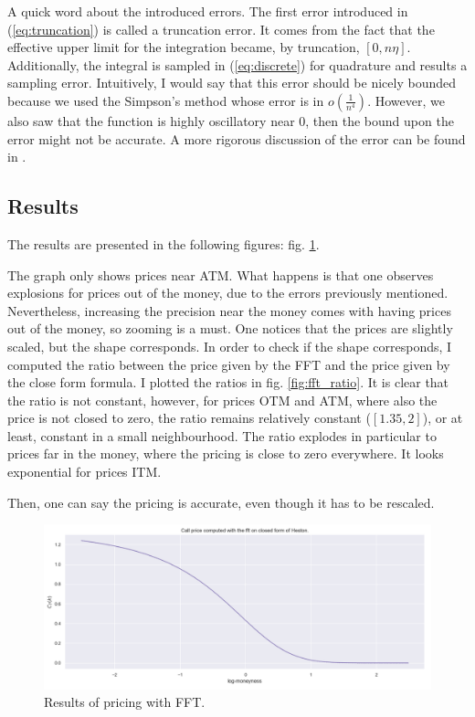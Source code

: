 A quick word about the introduced errors. The first error introduced in (\ref{eq:truncation}) is called a truncation error. It comes from the fact that the effective upper limit for the integration became, by truncation, $[0, n \eta ]$. Additionally, the integral is sampled in (\ref{eq:discrete}) for quadrature and results a sampling error. Intuitively, I would say that this error should be nicely bounded because we used the Simpson's method whose error is in $o( \frac 1 {n^4})$. However, we also saw that the function is highly oscillatory near $0$, then the bound upon the error might not be accurate. A more rigorous discussion of the error can be found in \cite{roger_lee}.





\subsection{Results}


The results are presented in the following figures: fig. \ref{fig:fft}.

The graph only shows prices near ATM. What happens is that one observes explosions for prices out of the money, due to the errors previously mentioned. Nevertheless, increasing the precision near the money comes with having prices out of the money, so zooming is a must. One notices that the prices are slightly scaled, but the shape corresponds. In order to check if the shape corresponds, I computed the ratio between the price given by the FFT and the price given by the close form formula. I plotted the ratios in fig. \ref{fig:fft_ratio}. It is clear that the ratio is not constant, however, for prices OTM and ATM, where also the price is not closed to zero, the ratio remains relatively constant ($[1.35,2]$), or at least, constant in a small neighbourhood. The ratio explodes in particular to prices far in the money, where the pricing is close to zero everywhere. It looks exponential for prices ITM.

Then, one can say the pricing is accurate, even though it has to be rescaled.


\begin{figure}
\centering
\includegraphics[width = 0.7 \textwidth]{../addition_part/images/integration_fft/fft.png}
\caption{Results of pricing with FFT.}
\label{fig:fft}
\end{figure}


